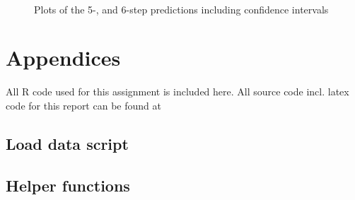 \begin{figure}
    \centering
    \mbox{ \quad 
            }
    \caption{Plots of the 5-, and 6-step predictions including confidence intervals}
    \label{fig:predictions-with-conf-2}
\end{figure}

\FloatBarrier

\pagebreak

\renewcommand\thesection{\Alph{section}}
\section{Appendices}

All R code used for this assignment is included here. All source code incl.
latex code for this report can be found at \githuburl

\subsection{Load data script}


\subsection{Helper functions}


